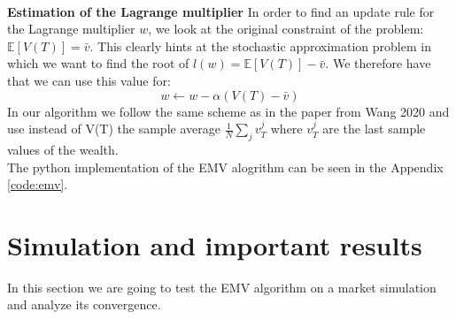 \documentclass[oneside, a4paper, onecolumn, 11pt]{article}
\begin{document}
\newline
\\\textbf{Estimation of the Lagrange multiplier} 
In order to find an update rule for the Lagrange multiplier $w$, we look at the original constraint of the problem: $\mathbb{E}[V(T)] = \bar{v}$. This clearly hints at the stochastic approximation problem in which we want to find the root of $l(w)= \mathbb{E}[V(T)]- \bar{v}$. We therefore have that we can use this value for:
\begin{equation}
    w \leftarrow w  - \alpha (V(T) -\bar{v} )
\end{equation}
In our algorithm we follow the same scheme as in the paper from Wang 2020 \cite{WangZhou2020} 
and use instead of V(T) the sample average $\frac{1}{N}\sum_j v_T^j$ where $ v^j_T$ are the last sample values of the wealth. 
\newline
\\The python implementation of the EMV alogrithm can be seen in the Appendix \eqref{code:emv}. 


\section{Simulation and important results}
In this section we are going to test the EMV algorithm on a market simulation and analyze its convergence.
\end{document}
